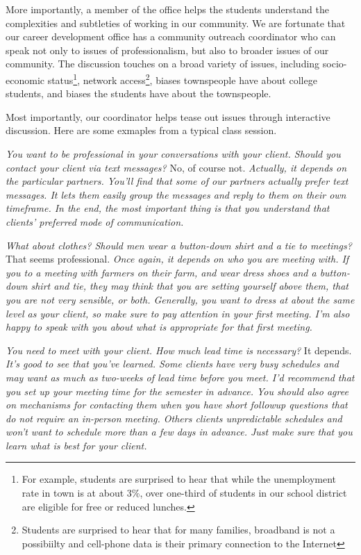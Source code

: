 More importantly, a member of the office helps the students understand
the complexities and subtleties of working in our community.  We
are fortunate that our career development office has a community
outreach coordinator who can speak not only to issues of professionalism,
but also to broader issues of our community.  The discussion touches
on a broad variety of issues, including socio-economic status\footnote{For
example, students are surprised to hear that while the unemployment
rate in town is at about 3\%, over one-third of students in our
school district are eligible for free or reduced lunches.}, network
access\footnote{Students are surprised to hear that for many families,
broadband is not a possibiilty and cell-phone data is their primary
connection to the Internet}, biases townspeople have about college
students, and biases the students have about the townspeople.

Most importantly, our coordinator helps tease out issues through interactive
discussion.  Here are some exmaples from a typical class session.

\newcommand{\question}[1]{\textsl{#1}}
\newcommand{\answer}[1]{#1}
\newcommand{\followup}[1]{\textsl{#1}}

\question{You want to be professional in your conversations with your client.  Should you contact your client via text messages?}
\answer{No, of course not.}
\followup{Actually, it depends on the particular partners.  You'll find that some of our partners actually prefer text messages.  It lets them easily group the messages and reply to them on their own timeframe.  In the end, the most important thing is that you understand that clients' preferred mode of communication.}

\question{What about clothes?  Should men wear a button-down shirt and a tie to meetings?}
\answer{That seems professional.}
\followup{Once again, it depends on who you are meeting with.  If
you to a meeting with farmers on their farm, and wear dress shoes
and a button-down shirt and tie, they may think that you are setting
yourself above them, that you are not very sensible, or both.
Generally, you want to dress at about the same level as your client,
so make sure to pay attention in your first meeting.  I'm also happy
to speak with you about what is appropriate for that first meeting.}

\question{You need to meet with your client.  How much lead time is necessary?}
\answer{It depends.}
\followup{It's good to see that you've learned.  Some clients have very
busy schedules and may want as much as two-weeks of lead time before
you meet.  I'd recommend that you set up your meeting time for the
semester in advance.  You should also agree on mechanisms for
contacting them when you have short followup questions that do not
require an in-person meeting.  Others clients unpredictable schedules
and won't want to schedule more than a few days in advance.  Just make
sure that you learn what is best for your client.}

